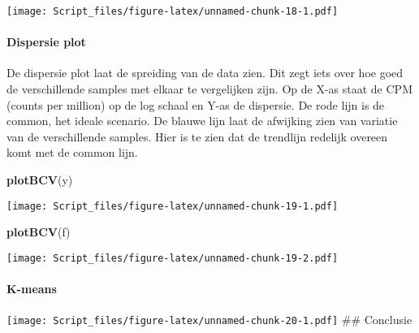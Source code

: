 \documentclass[
]{article}
\newenvironment{Shaded}{\begin{snugshade}}{\end{snugshade}}
\newcommand{\DataTypeTok}[1]{\textcolor[rgb]{0.13,0.29,0.53}{#1}}
\newcommand{\DecValTok}[1]{\textcolor[rgb]{0.00,0.00,0.81}{#1}}
\newcommand{\KeywordTok}[1]{\textcolor[rgb]{0.13,0.29,0.53}{\textbf{#1}}}
\newcommand{\NormalTok}[1]{#1}
\newcommand{\OperatorTok}[1]{\textcolor[rgb]{0.81,0.36,0.00}{\textbf{#1}}}
\newcommand{\StringTok}[1]{\textcolor[rgb]{0.31,0.60,0.02}{#1}}
\begin{document}
\texttt{[image: Script\_files/figure-latex/unnamed-chunk-18-1.pdf]}

\hypertarget{dispersie-plot}{%
\paragraph{Dispersie plot}\label{dispersie-plot}}

De dispersie plot laat de spreiding van de data zien. Dit zegt iets over
hoe goed de verschillende samples met elkaar te vergelijken zijn. Op de
X-as staat de CPM (counts per million) op de log schaal en Y-as de
dispersie. De rode lijn is de common, het ideale scenario. De blauwe
lijn laat de afwijking zien van variatie van de verschillende samples.
Hier is te zien dat de trendlijn redelijk overeen komt met de common
lijn.

\begin{Shaded}
\begin{Highlighting}[]
\KeywordTok{plotBCV}\NormalTok{(y)}
\end{Highlighting}
\end{Shaded}

\texttt{[image: Script\_files/figure-latex/unnamed-chunk-19-1.pdf]}

\begin{Shaded}
\begin{Highlighting}[]
\KeywordTok{plotBCV}\NormalTok{(f)}
\end{Highlighting}
\end{Shaded}

\texttt{[image: Script\_files/figure-latex/unnamed-chunk-19-2.pdf]}

\hypertarget{k-means}{%
\paragraph{K-means}\label{k-means}}

\begin{Shaded}
\end{Shaded}

\texttt{[image: Script\_files/figure-latex/unnamed-chunk-20-1.pdf]} \#\#
Conclusie
\end{document}
